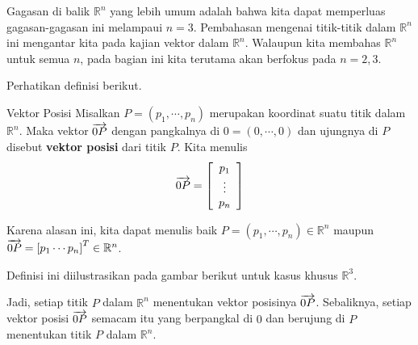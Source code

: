 Gagasan di balik $\mathbb{R}^n$ yang lebih umum adalah bahwa kita dapat memperluas
gagasan-gagasan ini melampaui $n = 3.$ Pembahasan mengenai titik-titik dalam $\mathbb{R}^n$ ini mengantar kita pada kajian vektor dalam $\mathbb{R}^n$. Walaupun kita membahas $\mathbb{R}^n$ untuk semua $n$,
pada bagian ini kita terutama akan berfokus pada $n=2,3$.

Perhatikan definisi berikut.

\begin{definition}{Vektor Posisi}\label{def:positionvector}
Misalkan $P=\left( p_{1},\cdots ,p_{n}\right) $ merupakan koordinat suatu
titik dalam $\mathbb{R}^{n}.$ Maka vektor $\overrightarrow{0P}$ dengan pangkalnya di
$0=\left( 0,\cdots ,0\right) $ dan ujungnya di
$P$ disebut \textbf{vektor posisi} dari
  titik $P$.
Kita menulis
\begin{equation*}
\overrightarrow{0P} = \left[
\begin{array}{c}
p_{1} \\
\vdots \\
p_{n}
\end{array} \right]
\end{equation*}
\end{definition}

Karena alasan ini, kita dapat menulis baik $P=\left( p_{1},\cdots ,p_{n}\right)  \in \mathbb{R}^{n}$
maupun $\overrightarrow{0P} = \left[ p_{1} \cdots p_{n} \right]^T \in \mathbb{R}^{n}$.

Definisi ini diilustrasikan pada gambar berikut untuk
kasus khusus $\mathbb{R}^{3}$.

\begin{center}
\par{}\label{fig:RnVectorsRn-tikz02}%

\end{center}

Jadi, setiap titik $P$ dalam $\mathbb{R}^{n}$ menentukan vektor posisinya
$\overrightarrow{0P}$. Sebaliknya, setiap vektor posisi $\overrightarrow{0P}$ semacam itu
yang berpangkal di $0$ dan berujung di $P$ menentukan titik $P$ dalam
$\mathbb{R}^{n}$.

